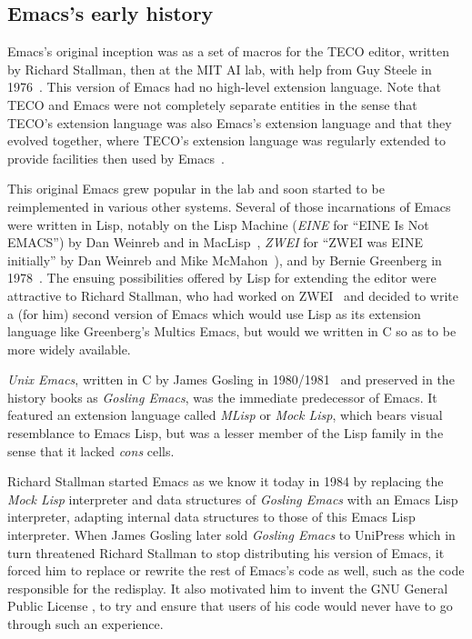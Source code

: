 \documentclass[format=acmsmall, review]{acmart}
\newcommand \Elisp {Emacs Lisp}
\begin{document}
\subsection{Emacs's early history}
\label{sec:emacs-early-history}

Emacs's original inception was as a set of macros for the TECO editor,
written by Richard Stallman, then at the MIT AI lab, with help from Guy
Steele in 1976~\cite{Stallman2018-personal}.
This version of Emacs had no high-level extension language.
Note that TECO and Emacs were not completely separate
entities in the sense that TECO's extension language was also Emacs's
extension language and that they evolved together, where TECO's extension
language was regularly extended to provide facilities then used by
Emacs~\cite{Stallman2002}.

This original Emacs grew popular in the lab and soon started to be
reimplemented in various other systems.  Several of those incarnations of
Emacs were written in Lisp, notably on the Lisp Machine (\emph{EINE} for
``EINE Is Not EMACS'') by Dan Weinreb and in
MacLisp~\cite{Moon1974,Pitman1983}, \emph{ZWEI} for ``ZWEI was EINE
initially'' by Dan Weinreb and Mike McMahon~\cite{Weinreb1979}), and by
Bernie Greenberg in 1978~\cite{Stallman2002}.  The ensuing possibilities
offered by Lisp for extending the editor were attractive to Richard
Stallman, who had worked on ZWEI~\cite{Stallman2018-personal} and decided to
write a (for him) second version of Emacs which would use Lisp as its
extension language like Greenberg's Multics Emacs, but would we written in
C so as to be more widely available.

\emph{Unix Emacs}, written in C by James Gosling in
1980/1981~\cite{Gosling1981} and preserved in the history books as
\emph{Gosling Emacs}, was the immediate predecessor of Emacs.
It featured an extension language called \emph{MLisp} or \emph{Mock Lisp},
which bears visual resemblance to \Elisp{}, but was a lesser member of the
Lisp family in the sense that it lacked \emph{cons} cells.

Richard Stallman started Emacs as we know it today in 1984 by replacing the
\emph{Mock Lisp} interpreter and data structures of \emph{Gosling Emacs}
with an \Elisp{} interpreter, adapting internal data structures to those of
this \Elisp{} interpreter.  When James Gosling later sold \emph{Gosling
  Emacs} to UniPress which in turn threatened Richard Stallman to stop
distributing his version of Emacs, it forced him to replace or rewrite the
rest of Emacs's code as well, such as the code responsible for the
redisplay.  It also motivated him to invent the GNU General Public License
\cite{GPLHistory}, to try and ensure that users
of his code would never have to go through such an experience.
\end{document}

